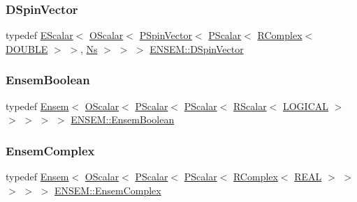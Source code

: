 \mbox{\label{group__defs_gab4f32134903c54aa9441e3bff44b44f5}} 
\subsubsection{\texorpdfstring{DSpinVector}{DSpinVector}}
{\footnotesize\ttfamily typedef \mbox{\hyperlink{classENSEM_1_1EScalar}{E\+Scalar}}$<$ \mbox{\hyperlink{classENSEM_1_1OScalar}{O\+Scalar}}$<$ \mbox{\hyperlink{classENSEM_1_1PSpinVector}{P\+Spin\+Vector}}$<$ \mbox{\hyperlink{classENSEM_1_1PScalar}{P\+Scalar}}$<$ \mbox{\hyperlink{classENSEM_1_1RComplex}{R\+Complex}}$<$ \mbox{\hyperlink{namespaceENSEM_adcbd0de4e9e0e7ef6aa9b681a554e2c5}{D\+O\+U\+B\+LE}} $>$ $>$, \mbox{\hyperlink{namespaceENSEM_a6f05e048f9b2eb1a19131074f8abc25f}{Ns}} $>$ $>$ $>$ \mbox{\hyperlink{group__defs_gab4f32134903c54aa9441e3bff44b44f5}{E\+N\+S\+E\+M\+::\+D\+Spin\+Vector}}}

\mbox{\label{group__defs_gac6945505f3ac714277458e0a944c15f0}} 
\subsubsection{\texorpdfstring{EnsemBoolean}{EnsemBoolean}}
{\footnotesize\ttfamily typedef \mbox{\hyperlink{classENSEM_1_1Ensem}{Ensem}}$<$ \mbox{\hyperlink{classENSEM_1_1OScalar}{O\+Scalar}}$<$ \mbox{\hyperlink{classENSEM_1_1PScalar}{P\+Scalar}}$<$ \mbox{\hyperlink{classENSEM_1_1PScalar}{P\+Scalar}}$<$ \mbox{\hyperlink{classENSEM_1_1RScalar}{R\+Scalar}}$<$ \mbox{\hyperlink{namespaceENSEM_ade7c8d5976e979516f8c2ecd223dd0b6}{L\+O\+G\+I\+C\+AL}} $>$ $>$ $>$ $>$ $>$ \mbox{\hyperlink{group__defs_gac6945505f3ac714277458e0a944c15f0}{E\+N\+S\+E\+M\+::\+Ensem\+Boolean}}}

\mbox{\label{group__defs_ga5d1497403fdbca6ecdeec3d05de9a223}} 
\subsubsection{\texorpdfstring{EnsemComplex}{EnsemComplex}}
{\footnotesize\ttfamily typedef \mbox{\hyperlink{classENSEM_1_1Ensem}{Ensem}}$<$ \mbox{\hyperlink{classENSEM_1_1OScalar}{O\+Scalar}}$<$ \mbox{\hyperlink{classENSEM_1_1PScalar}{P\+Scalar}}$<$ \mbox{\hyperlink{classENSEM_1_1PScalar}{P\+Scalar}}$<$ \mbox{\hyperlink{classENSEM_1_1RComplex}{R\+Complex}}$<$ \mbox{\hyperlink{namespaceENSEM_a6dd9aa6508168f545c861787e63ddd1e}{R\+E\+AL}} $>$ $>$ $>$ $>$ $>$ \mbox{\hyperlink{group__defs_ga5d1497403fdbca6ecdeec3d05de9a223}{E\+N\+S\+E\+M\+::\+Ensem\+Complex}}}

